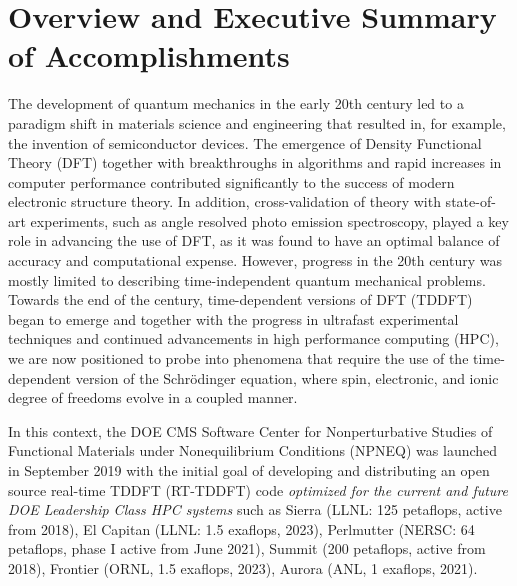 \section{Overview and Executive Summary of Accomplishments}
\label{sec:overview}

The development of quantum mechanics in the early 20th century led to a paradigm shift in materials science and engineering that resulted in, for example, the invention of semiconductor devices. The emergence of Density Functional Theory (DFT) together with breakthroughs in algorithms \cite{Cooley1965,Martin1988} and rapid increases in computer performance contributed significantly to the success of modern electronic structure theory. In addition, cross-validation of theory with state-of-art experiments, such as angle resolved photo emission spectroscopy, played a key role in advancing the use of DFT, as it was found to have an optimal balance of accuracy and computational expense. However, progress in the 20th century was mostly limited to describing time-independent quantum mechanical problems. Towards the end of the century, time-dependent versions of DFT (TDDFT) began to emerge \cite{RungeGross1984} and together with the progress in ultrafast experimental techniques and continued advancements in high performance computing (HPC), we are now positioned to probe into phenomena that require the use of the time-dependent version of the Schr\"{o}dinger equation, where spin, electronic, and ionic degree of freedoms evolve in a coupled manner. 

In this context, the DOE CMS Software Center for Nonperturbative Studies of Functional Materials under Nonequilibrium Conditions (NPNEQ) was launched in September 2019 with the initial goal of developing and distributing an open source real-time TDDFT (RT-TDDFT) code {\it optimized for the current and future DOE Leadership Class HPC systems} such as Sierra (LLNL: 125 petaflops, active from 2018), El Capitan (LLNL: 1.5 exaflops, 2023), Perlmutter (NERSC: 64 petaflops, phase I active from June 2021), Summit (200 petaflops, active from 2018), Frontier (ORNL, 1.5 exaflops, 2023), Aurora (ANL, 1 exaflops, 2021). 


